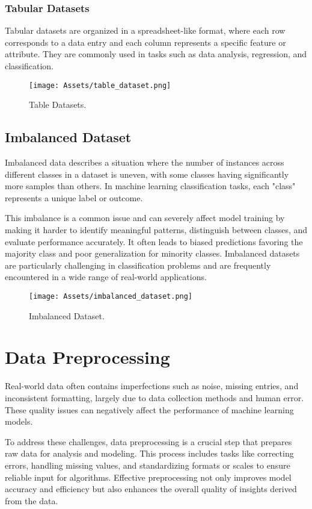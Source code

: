 \subsubsection*{Tabular Datasets}
Tabular datasets are organized in a spreadsheet-like format, where each row corresponds to a data entry and each column represents a specific feature or attribute. They are commonly used in tasks such as data analysis, regression, and classification.
\begin{figure}[H]
    \centering
    \texttt{[image: Assets/table\_dataset.png]}
    \caption{Table Datasets.}
    \label{fig:table_dataset}
\end{figure}

\subsection{Imbalanced Dataset}
Imbalanced data describes a situation where the number of instances across different classes in a dataset is uneven, with some classes having significantly more samples than others. In machine learning classification tasks, each "class" represents a unique label or outcome.

This imbalance is a common issue and can severely affect model training by making it harder to identify meaningful patterns, distinguish between classes, and evaluate performance accurately. It often leads to biased predictions favoring the majority class and poor generalization for minority classes. Imbalanced datasets are particularly challenging in classification problems and are frequently encountered in a wide range of real-world applications.

\begin{figure}[H]
    \centering
    \texttt{[image: Assets/imbalanced\_dataset.png]}
    \caption{Imbalanced Dataset.}
    \label{fig:imbalanced_dataset}
\end{figure}

\section{Data Preprocessing}
Real-world data often contains imperfections such as noise, missing entries, and inconsistent formatting, largely due to data collection methods and human error. These quality issues can negatively affect the performance of machine learning models.

To address these challenges, data preprocessing is a crucial step that prepares raw data for analysis and modeling. This process includes tasks like correcting errors, handling missing values, and standardizing formats or scales to ensure reliable input for algorithms. Effective preprocessing not only improves model accuracy and efficiency but also enhances the overall quality of insights derived from the data.

